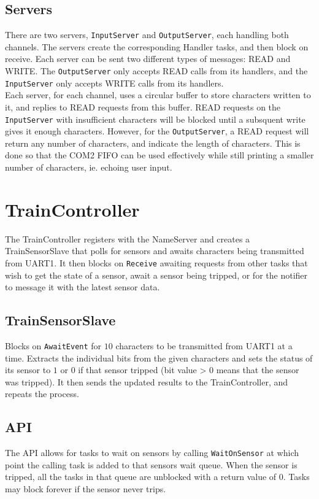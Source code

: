 \documentclass[12pt]{article}
\begin{document}
\subsection{Servers}
There are two servers, \texttt{InputServer} and \texttt{OutputServer}, each handling both channels. The servers create
the corresponding Handler tasks, and then block on receive. Each server can be sent two different types of messages:
READ and WRITE. The \texttt{OutputServer} only accepts READ calls from its handlers, and the \texttt{InputServer} only
accepts WRITE calls from its handlers.
\\
Each server, for each channel, uses a circular buffer to store characters written to it, and replies to READ requests
from this buffer. READ requests on the \texttt{InputServer} with insufficient characters will be blocked until a
subsquent write gives it enough characters. However, for the \texttt{OutputServer}, a READ request will return any
number of characters, and indicate the length of characters. This is done so that the COM2 FIFO can be used effectively
while still printing a smaller number of characters, ie. echoing user input.

\section{TrainController}
The TrainController registers with the NameServer and creates a TrainSensorSlave that polls for sensors and awaits characters being transmitted from UART1.  It then blocks on \texttt{Receive} awaiting requests from other tasks that wish to get the state of a sensor, await a sensor being tripped, or for the notifier to message it with the latest sensor data.
\\
\subsection{TrainSensorSlave}
Blocks on \texttt{AwaitEvent} for $10$ characters to be transmitted from UART1 at a time.  Extracts the individual bits from the given characters and sets the status of its sensor to $1$ or $0$ if that sensor tripped (bit value > 0 means that the sensor was tripped).  It then sends the updated results to the TrainController, and repeats the process.
\\[1\baselineskip]
\subsection{API}
The API allows for tasks to wait on sensors by calling \texttt{WaitOnSensor} at which point the calling task is added to that sensors wait queue.  When the sensor is tripped, all the tasks in that queue are unblocked with a return value of $0$.  Tasks may block forever if the sensor never trips.
\\[2\baselineskip]
\end{document}
